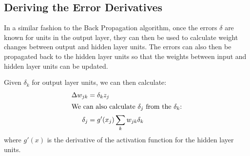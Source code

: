 \documentclass[a4paper]{article}
\begin{document}
\subsection{Deriving the Error Derivatives}

In a similar fashion to the Back Propagation algorithm, once the
errors $\delta$ are known for units in the output layer, they can then
be used to calculate weight changes between output and hidden layer
units. The errors can also then be propagated back to the hidden layer
units so that the weights between input and hidden layer units can be
updated.

Given $\delta_k$ for output layer units, we can then calculate:
\begin{align}
\Delta w_{jk} & = \delta_k z_j \\
\intertext{We can also calculate $\delta_j$ from the $\delta_k$:}
\delta_j &= g'(x_j) \sum_{k} w_{jk} \delta_k \label{eqn:errorslayerj}
\end{align}
where $g'(x)$ is the derivative of the activation function for the
hidden layer units.
\end{document}
